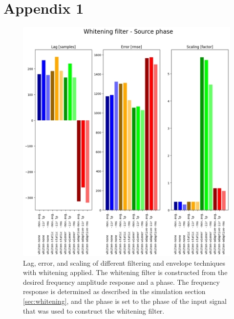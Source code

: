 \chapter{Appendix 1} \label{app:whitening}

\begin{figure}[h!t]
	\begin{center}
		\includegraphics[width=1.0\columnwidth]{images/result_whitening_sourcephase.png}
	\end{center}
	\caption{Lag, error, and scaling of different filtering and envelope techniques with whitening applied. The whitening filter is constructed from the desired frequency amplitude response and a phase. The frequency response is determined as described in the simulation section \ref{sec:whitening}, and the phase is set to the phase of the input signal that was used to construct the whitening filter. }
	\label{fig:result_whitening_sourcephase}
\end{figure}

